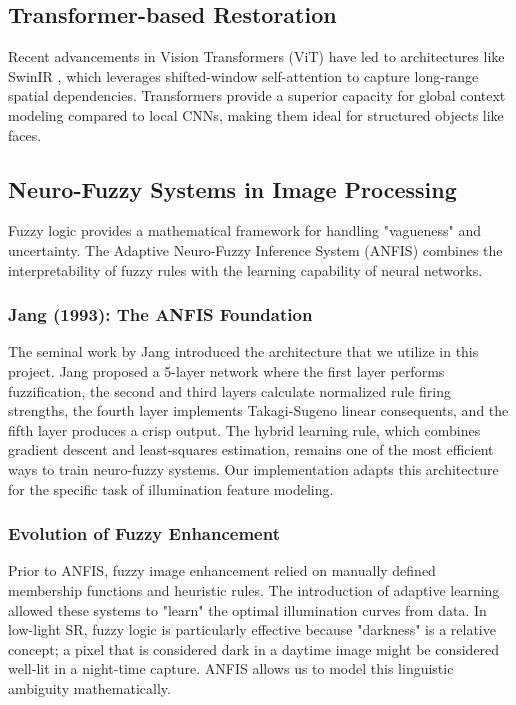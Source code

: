 \subsection{Transformer-based Restoration}
Recent advancements in Vision Transformers (ViT) have led to architectures like SwinIR \cite{liang2021swinir}, which leverages shifted-window self-attention to capture long-range spatial dependencies. Transformers provide a superior capacity for global context modeling compared to local CNNs, making them ideal for structured objects like faces.

\subsection{Neuro-Fuzzy Systems in Image Processing}
Fuzzy logic provides a mathematical framework for handling "vagueness" and uncertainty. The Adaptive Neuro-Fuzzy Inference System (ANFIS) \cite{jang1993anfis} combines the interpretability of fuzzy rules with the learning capability of neural networks. 

\subsubsection{Jang (1993): The ANFIS Foundation}
The seminal work by Jang \cite{jang1993anfis} introduced the architecture that we utilize in this project. Jang proposed a 5-layer network where the first layer performs fuzzification, the second and third layers calculate normalized rule firing strengths, the fourth layer implements Takagi-Sugeno linear consequents, and the fifth layer produces a crisp output. The hybrid learning rule, which combines gradient descent and least-squares estimation, remains one of the most efficient ways to train neuro-fuzzy systems. Our implementation adapts this architecture for the specific task of illumination feature modeling.

\subsubsection{Evolution of Fuzzy Enhancement}
Prior to ANFIS, fuzzy image enhancement relied on manually defined membership functions and heuristic rules. The introduction of adaptive learning allowed these systems to "learn" the optimal illumination curves from data. In low-light SR, fuzzy logic is particularly effective because "darkness" is a relative concept; a pixel that is considered dark in a daytime image might be considered well-lit in a night-time capture. ANFIS allows us to model this linguistic ambiguity mathematically.

